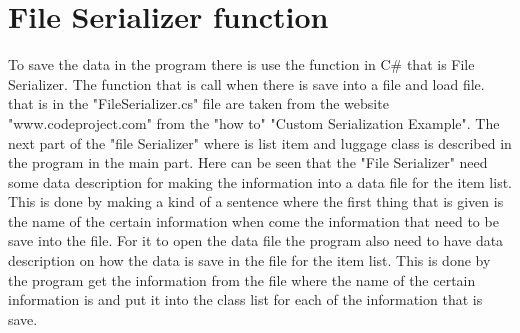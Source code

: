 \section{File Serializer function}
To save the data in the program there is use the function in C# that is File Serializer. The function that is call when there is save into a file and load file. that is in the "FileSerializer.cs" file are taken from the website "www.codeproject.com" from the "how to" "Custom Serialization Example". The next part of the "file Serializer" where is list item and luggage class is described in the program in the main part.
Here can be seen that the "File Serializer" need some data description for making the information into a data file for the item list. This is done by making a kind of a sentence where the first thing that is given is the name of the certain information when come the information that need to be save into the file.
For it to open the data file the program also need to have data description on how the data is save in the file for the item list. This is done by the program get the information from the file where the name of the certain information is and put it into the class list for each of the information that is save.